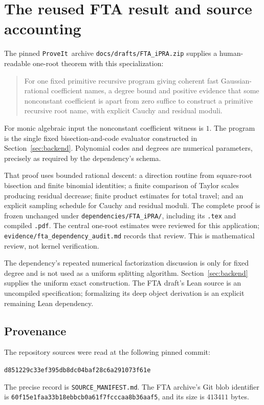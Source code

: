 \documentclass[11pt]{article}
\theoremstyle{definition}
\newcommand{\repo}{\texttt{ProveIt}}
\newcommand{\pin}{\texttt{d851229c33ef395db8dc04baf28c6a291073f61e}}
\begin{document}


\appendix


\section{The reused FTA result and source accounting}
\label{sec:fta}
The pinned \repo\ archive \texttt{docs/drafts/FTA\_iPRA.zip} supplies a
human-readable one-root theorem with this specialization:

\begin{quote}
For one fixed primitive recursive program giving coherent fast
Gaussian-rational coefficient names, a degree bound and positive evidence
that some nonconstant coefficient is apart from zero suffice to construct
a primitive recursive root name, with explicit Cauchy and residual moduli.
\end{quote}

For monic algebraic input the nonconstant coefficient witness is \(1\).
The program is the single fixed bisection-and-code evaluator constructed
in Section~\ref{sec:backend}. Polynomial codes and degrees are numerical
parameters, precisely as required by the dependency's schema.

That proof uses bounded rational descent: a direction routine from
square-root bisection and finite binomial identities; a finite comparison
of Taylor scales producing residual decrease; finite product estimates for
total travel; and an explicit sampling schedule for Cauchy and residual
moduli. The complete proof is frozen unchanged under
\texttt{dependencies/FTA\_iPRA/}, including its \texttt{.tex} and compiled
\texttt{.pdf}. The central one-root estimates were reviewed for this
application; \texttt{evidence/fta\_dependency\_audit.md} records that review.
This is mathematical review, not kernel verification.

The dependency's repeated numerical factorization discussion is only for
fixed degree and is not used as a uniform splitting algorithm.
Section~\ref{sec:backend} supplies the uniform exact construction.
The FTA draft's Lean source is an uncompiled specification; formalizing its
deep object derivation is an explicit remaining Lean dependency.

\subsection*{Provenance}
The repository sources were read at the following pinned commit:
\begin{center}\pin\end{center}
The precise record is \texttt{SOURCE\_MANIFEST.md}.
The FTA archive's Git blob identifier is
\texttt{60f15e1faa33b18ebbcb0a61f7fcccaa8b36aaf5}, and its size is
\(413411\) bytes.
\end{document}
